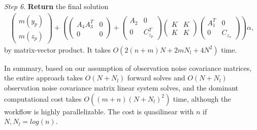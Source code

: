 \documentclass[article,ij4uq]{ij4uq}              %
\begin{document}
\begin{algorithm}[h!]
\textit{Step 6}. \textbf{Return} the final solution
\begin{align}
    \begin{pmatrix}m(y_{p})\\m(z_{p})\end{pmatrix}+\left(\begin{pmatrix}A_{4}A_{3}^{T}&0\\0&0\end{pmatrix}+\begin{pmatrix}A_{2}&0\\0&C_{z_{p}}^{T}\end{pmatrix}\begin{pmatrix}K&K\\K&K\end{pmatrix}\begin{pmatrix}A_{1}^{T}&0\\0&C_{z_{o}}\end{pmatrix}\right)\alpha,
\end{align}
by matrix-vector product. It takes $O(2(n+m)N+2mN_{l}+4N^{2})$ time.
\end{algorithm}

\par In summary, based on our assumption of observation noise covariance matrices, the entire approach takes $O(N+N_{l})$ forward solves and $O(N+N_{l})$ observation noise covariance matrix linear system solves, and the dominant computational cost takes $O((m+n)(N+N_{l})^{2})$ time, although the workflow is highly parallelizable. The cost is quasilinear with $n$ if $N,N_{l}=log(n)$.
\end{document}
